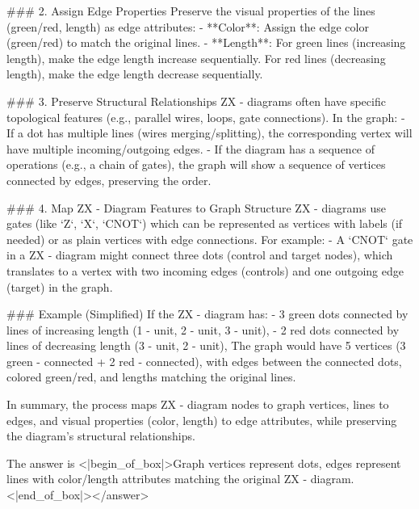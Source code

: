 ### 2. Assign Edge Properties  
Preserve the visual properties of the lines (green/red, length) as edge attributes:  
- **Color**: Assign the edge color (green/red) to match the original lines.  
- **Length**: For green lines (increasing length), make the edge length increase sequentially. For red lines (decreasing length), make the edge length decrease sequentially.    


### 3. Preserve Structural Relationships  
ZX - diagrams often have specific topological features (e.g., parallel wires, loops, gate connections). In the graph:  
- If a dot has multiple lines (wires merging/splitting), the corresponding vertex will have multiple incoming/outgoing edges.  
- If the diagram has a sequence of operations (e.g., a chain of gates), the graph will show a sequence of vertices connected by edges, preserving the order.    


### 4. Map ZX - Diagram Features to Graph Structure  
ZX - diagrams use gates (like `Z`, `X`, `CNOT`) which can be represented as vertices with labels (if needed) or as plain vertices with edge connections. For example:  
- A `CNOT` gate in a ZX - diagram might connect three dots (control and target nodes), which translates to a vertex with two incoming edges (controls) and one outgoing edge (target) in the graph.    


### Example (Simplified)  
If the ZX - diagram has:  
- 3 green dots connected by lines of increasing length (1 - unit, 2 - unit, 3 - unit),  
- 2 red dots connected by lines of decreasing length (3 - unit, 2 - unit),  
The graph would have 5 vertices (3 green - connected + 2 red - connected), with edges between the connected dots, colored green/red, and lengths matching the original lines.    


In summary, the process maps ZX - diagram nodes to graph vertices, lines to edges, and visual properties (color, length) to edge attributes, while preserving the diagram’s structural relationships.  

The answer is <|begin_of_box|>Graph vertices represent dots, edges represent lines with color/length attributes matching the original ZX - diagram.<|end_of_box|></answer>